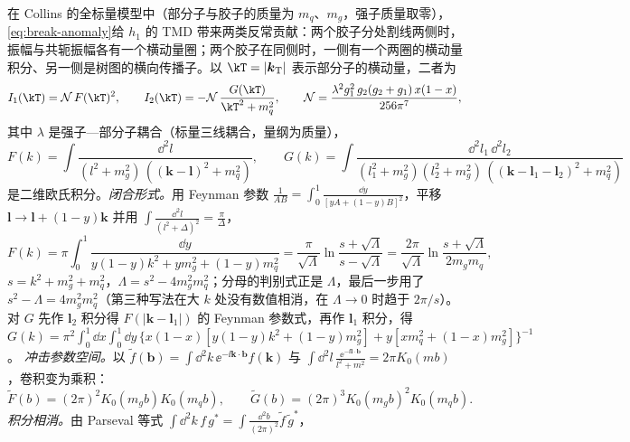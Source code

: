 \begin{example}\label{ex:break-c07}
在 Collins 的全标量模型中（部分子与胶子的质量为 $m_q$、$m_g$，强子质量取零），\cref{eq:break-anomaly}给 $h_1$ 的 TMD 带来两类反常贡献：两个胶子分处割线两侧时，振幅与共轭振幅各有一个横动量圈；两个胶子在同侧时，一侧有一个两圈的横动量积分、另一侧是树图的横向传播子。以 $\kT=|\boldsymbol k_{\mathrm T}|$ 表示部分子的横动量，二者为\cite[式~(10)(11)]{Collins2007}
\begin{equation}\label{eq:break-I12}
I_1(\kT)=\mathcal N\,F(\kT)^2,\qquad I_2(\kT)=-\mathcal N\,\frac{G(\kT)}{\kT^2+m_q^2},\qquad \mathcal N=\frac{\lambda^2g_1^2\,g_2(g_2+g_1)\,x(1-x)}{256\pi^7},
\end{equation}
其中 $\lambda$ 是强子—部分子耦合（标量三线耦合，量纲为质量），
\begin{equation}\label{eq:break-FG}
F(k)=\int\frac{\dd^2l}{(l^2+m_g^2)\,((\boldsymbol k-\boldsymbol l)^2+m_q^2)},\qquad
G(k)=\int\frac{\dd^2l_1\,\dd^2l_2}{(l_1^2+m_g^2)(l_2^2+m_g^2)\,((\boldsymbol k-\boldsymbol l_1-\boldsymbol l_2)^2+m_q^2)}
\end{equation}
是二维欧氏积分。\emph{闭合形式。}用 Feynman 参数 $\frac1{AB}=\int_0^1\frac{\dd y}{[yA+(1-y)B]^2}$，平移 $\boldsymbol l\to\boldsymbol l+(1-y)\boldsymbol k$ 并用 $\int\frac{\dd^2l}{(l^2+\Delta)^2}=\frac\pi\Delta$，
\begin{equation}\label{eq:break-F-closed}
F(k)=\pi\int_0^1\frac{\dd y}{y(1-y)k^2+ym_g^2+(1-y)m_q^2}=\frac{\pi}{\sqrt\Lambda}\ln\frac{s+\sqrt\Lambda}{s-\sqrt\Lambda}=\frac{2\pi}{\sqrt\Lambda}\ln\frac{s+\sqrt\Lambda}{2m_gm_q},
\end{equation}
$s=k^2+m_g^2+m_q^2$，$\Lambda=s^2-4m_g^2m_q^2$；分母的判别式正是 $\Lambda$，最后一步用了 $s^2-\Lambda=4m_g^2m_q^2$（第三种写法在大 $k$ 处没有数值相消，在 $\Lambda\to0$ 时趋于 $2\pi/s$）。对 $G$ 先作 $\boldsymbol l_2$ 积分得 $F(|\boldsymbol k-\boldsymbol l_1|)$ 的 Feynman 参数式，再作 $\boldsymbol l_1$ 积分，得
$G(k)=\pi^2\int_0^1\dd x\int_0^1\dd y\,\big\{x(1-x)[y(1-y)k^2+(1-y)m_g^2]+y[xm_q^2+(1-x)m_g^2]\big\}^{-1}$。
\emph{冲击参数空间。}以 $\tilde f(\boldsymbol b)=\int\dd^2k\,\ee^{-\ii\boldsymbol k\cdot\boldsymbol b}f(\boldsymbol k)$ 与 $\int\dd^2l\,\frac{\ee^{-\ii\boldsymbol l\cdot\boldsymbol b}}{l^2+m^2}=2\pi K_0(mb)$，卷积变为乘积：
\begin{equation}\label{eq:break-FG-b}
\tilde F(b)=(2\pi)^2K_0(m_gb)K_0(m_qb),\qquad \tilde G(b)=(2\pi)^3K_0(m_gb)^2K_0(m_qb).
\end{equation}
\emph{积分相消。}由 Parseval 等式 $\int\dd^2k\,f\,g^*=\int\frac{\dd^2b}{(2\pi)^2}\tilde f\,\tilde g^*$，

\end{example}
